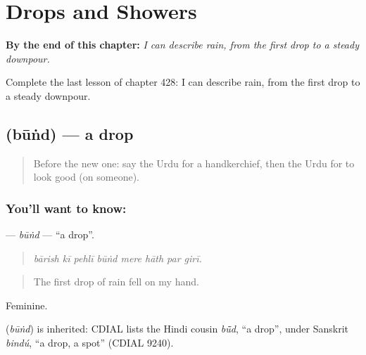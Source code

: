 
\chapter{Drops and Showers}
\label{ch:ur-drops-and-showers}

\begin{chapteropening}
\textbf{By the end of this chapter:} \emph{I can describe rain, from the first drop to a steady downpour.}

Complete the last lesson of chapter 428: I can describe rain, from the first drop to a steady downpour.
\end{chapteropening}

\section[\texorpdfstring{\ur{بوند} (būṅd)}{بوند (būṅd)}]{ (būṅd) — a drop}

\label{lesson:UR-C428-bund}



\begin{quote}
Before the new one: say the Urdu for a handkerchief, then the Urdu for to look good (on someone).
\end{quote}

\subsection*{You'll want to know: }
\textbf{} — \emph{būṅd} — \textquotedblleft{}a drop\textquotedblright{}.

\begin{quote}
       
\end{quote}

\begin{quote}
\emph{bārish kī pehlī būṅd mere hāth par girī.}
\end{quote}

\begin{quote}
The first drop of rain fell on my hand.
\end{quote}

Feminine.

\begin{cousinweb}
\textbf{} (\emph{būṅd}) is inherited: CDIAL lists the Hindi cousin \emph{bū̃d}, \textquotedblleft{}a drop\textquotedblright{}, under Sanskrit \emph{bindú}, \textquotedblleft{}a drop, a spot\textquotedblright{} (CDIAL 9240).
\end{cousinweb}

